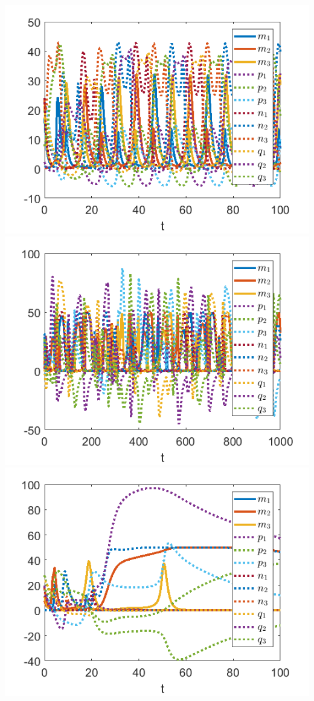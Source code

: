 \documentclass{article}
\begin{document}
\begin{center}
    \includegraphics[scale = .5]{several_periods.png}
        \includegraphics[scale = .5]{lots_of_periods.png}
        \includegraphics[scale = .5]{weirdness.png}

\end{center}
\end{document}
